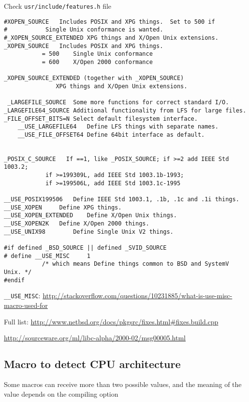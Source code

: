 Check \verb!usr/include/features.h! file
\begin{verbatim}
#XOPEN_SOURCE	Includes POSIX and XPG things.  Set to 500 if
#			Single Unix conformance is wanted.
#_XOPEN_SOURCE_EXTENDED XPG things and X/Open Unix extensions.
_XOPEN_SOURCE	Includes POSIX and XPG things.
           = 500	Single Unix conformance
           = 600	X/Open 2000 conformance
           
_XOPEN_SOURCE_EXTENDED (together with _XOPEN_SOURCE)
               XPG things and X/Open Unix extensions.

 _LARGEFILE_SOURCE	Some more functions for correct standard I/O.
_LARGEFILE64_SOURCE	Additional functionality from LFS for large files.
_FILE_OFFSET_BITS=N	Select default filesystem interface.
    __USE_LARGEFILE64	Define LFS things with separate names.
    __USE_FILE_OFFSET64	Define 64bit interface as default.


_POSIX_C_SOURCE   If ==1, like _POSIX_SOURCE; if >=2 add IEEE Std 1003.2;
 			if >=199309L, add IEEE Std 1003.1b-1993;
 			if >=199506L, add IEEE Std 1003.1c-1995

__USE_POSIX199506	Define IEEE Std 1003.1, .1b, .1c and .1i things.
__USE_XOPEN		Define XPG things.
__USE_XOPEN_EXTENDED	Define X/Open Unix things.
__USE_XOPEN2K	Define X/Open 2000 things.
__USE_UNIX98		Define Single Unix V2 things.

#if defined _BSD_SOURCE || defined _SVID_SOURCE
# define __USE_MISC     1   
           /* which means Define things common to BSD and SystemV Unix. */ 
#endif
\end{verbatim}

\verb!__USE_MISC!:
\url{http://stackoverflow.com/questions/10231885/what-is-use-misc-macro-used-for}

Full list: 
\url{http://www.netbsd.org/docs/pkgsrc/fixes.html#fixes.build.cpp}

 
\url{http://sourceware.org/ml/libc-alpha/2000-02/msg00005.html}


\subsection{Macro to detect CPU architecture}
\label{sec:macro-detect-CPU}

Some macros can receive more than two possible values, and the meaning of the
value depends on the compiling option

